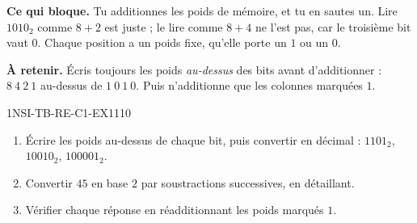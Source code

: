 

\textbf{Ce qui bloque.} Tu additionnes les poids de mémoire, et tu en sautes un. Lire
$1010_2$ comme $8+2$ est juste ; le lire comme $8+4$ ne l'est pas, car le troisième bit vaut
$0$. Chaque position a un poids fixe, qu'elle porte un $1$ ou un $0$.

\textbf{À retenir.} Écris toujours les poids \emph{au-dessus} des bits avant d'additionner :
$8\ 4\ 2\ 1$ au-dessus de $1\ 0\ 1\ 0$. Puis n'additionne que les colonnes marquées $1$.

\begin{exercice}{1NSI-TB-RE-C1-EX1}{1}{10}
\begin{enumerate}
  \item Écrire les poids au-dessus de chaque bit, puis convertir en décimal :
        $1101_2$, $10010_2$, $100001_2$.
  \item Convertir $45$ en base $2$ par soustractions successives, en détaillant.
  \item Vérifier chaque réponse en réadditionnant les poids marqués $1$.
\end{enumerate}
\end{exercice}

